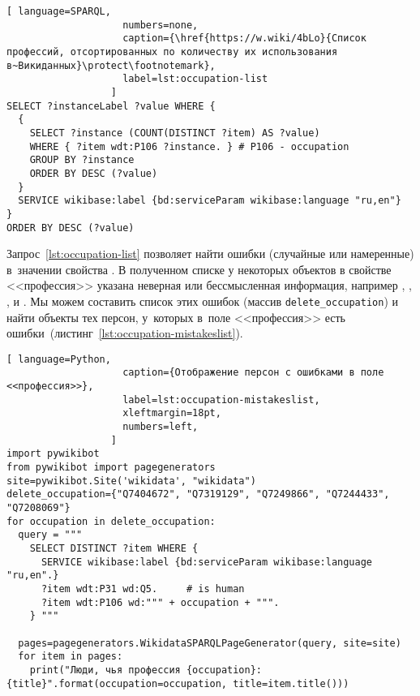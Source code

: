 \newpage
\begin{lstlisting}[ language=SPARQL,
                    numbers=none,
                    caption={\href{https://w.wiki/4bLo}{Cписок профессий, отсортированных по количеству их использования в~Викиданных}\protect\footnotemark},
                    label=lst:occupation-list
                  ]
SELECT ?instanceLabel ?value WHERE {
  {
    SELECT ?instance (COUNT(DISTINCT ?item) AS ?value) 
    WHERE { ?item wdt:P106 ?instance. } # P106 - occupation
    GROUP BY ?instance
    ORDER BY DESC (?value)
  }
  SERVICE wikibase:label {bd:serviceParam wikibase:language "ru,en"}
}
ORDER BY DESC (?value)
\end{lstlisting} 

Запрос~\ref{lst:occupation-list} позволяет найти ошибки 
(случайные или намеренные) в~значении свойства . 
В полученном списке у некоторых объектов в свойстве <<профессия>> 
указана неверная или бессмысленная информация, 
например 
, 
, 
, 
 и 
. 
Мы можем составить список этих ошибок (массив \lstinline|delete_occupation|)
и найти объекты тех персон, 
у~которых в~поле <<профессия>> есть ошибки~(листинг~\ref{lst:occupation-mistakeslist}).




\newpage
{}
\begin{lstlisting}[ language=Python,
                    caption={Отображение персон с ошибками в поле <<профессия>>},
                    label=lst:occupation-mistakeslist,
                    xleftmargin=18pt, 
                    numbers=left,
                  ]
import pywikibot
from pywikibot import pagegenerators
site=pywikibot.Site('wikidata', "wikidata")
delete_occupation={"Q7404672", "Q7319129", "Q7249866", "Q7244433", 
"Q7208069"}
for occupation in delete_occupation:
  query = """
    SELECT DISTINCT ?item WHERE {
      SERVICE wikibase:label {bd:serviceParam wikibase:language "ru,en".}
      ?item wdt:P31 wd:Q5.     # is human
      ?item wdt:P106 wd:""" + occupation + """.
    } """

  pages=pagegenerators.WikidataSPARQLPageGenerator(query, site=site)
  for item in pages:
    print("Люди, чья профессия {occupation}: {title}".format(occupation=occupation, title=item.title()))
\end{lstlisting} 


